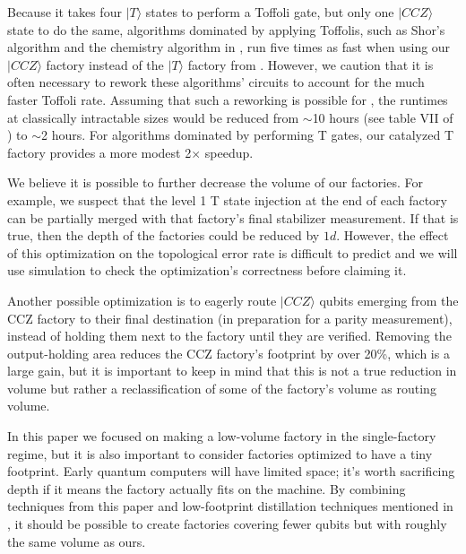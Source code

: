 \documentclass[superscriptaddress,notitlepage,longbibliography]{revtex4-1}
\begin{document}
Because it takes four $|T\rangle$ states to perform a Toffoli gate, but only one $|CCZ\rangle$ state to do the same, algorithms dominated by applying Toffolis, such as Shor's algorithm and the chemistry algorithm in \cite{babbush2018}, run five times as fast when using our $|CCZ\rangle$ factory instead of the $|T\rangle$ factory from \cite{fowler2018}.
However, we caution that it is often necessary to rework these algorithms' circuits to account for the much faster Toffoli rate.
Assuming that such a reworking is possible for \cite{babbush2018}, the runtimes at classically intractable sizes would be reduced from $\sim$10 hours (see table VII of \cite{babbush2018}) to $\sim$2 hours.
For algorithms dominated by performing T gates, our catalyzed T factory provides a more modest 2$\times$ speedup.

We believe it is possible to further decrease the volume of our factories.
For example, we suspect that the level 1 T state injection at the end of each factory can be partially merged with that factory's final stabilizer measurement.
If that is true, then the depth of the factories could be reduced by $1d$.
However, the effect of this optimization on the topological error rate is difficult to predict and we will use simulation to check the optimization's correctness before claiming it.

Another possible optimization is to eagerly route $|CCZ\rangle$ qubits emerging from the CCZ factory to their final destination (in preparation for a parity measurement), instead of holding them next to the factory until they are verified.
Removing the output-holding area reduces the CCZ factory's footprint by over 20\%, which is a large gain, but it is important to keep in mind that this is not a true reduction in volume but rather a reclassification of some of the factory's volume as routing volume.

In this paper we focused on making a low-volume factory in the single-factory regime, but it is also important to consider factories optimized to have a tiny footprint.
Early quantum computers will have limited space; it's worth sacrificing depth if it means the factory actually fits on the machine.
By combining techniques from this paper and low-footprint distillation techniques mentioned in \cite{litinski2018}, it should be possible to create factories covering fewer qubits but with roughly the same volume as ours.
\end{document}
